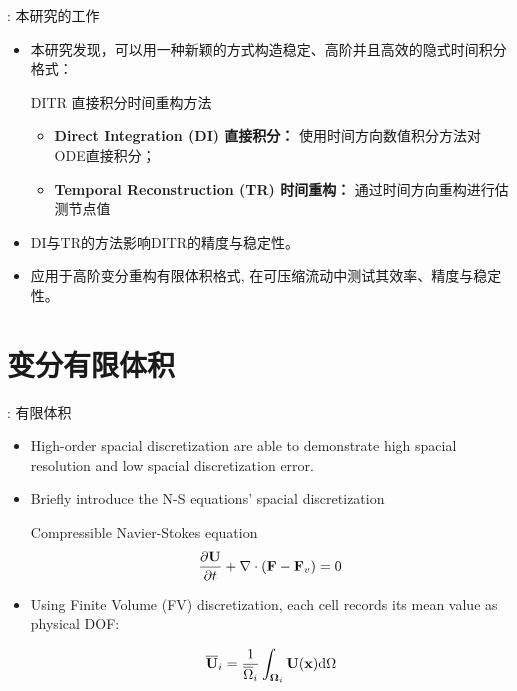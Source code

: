 \documentclass[aspectratio=169,serif]{beamer} %
\begin{document}
\begin{frame}{\secname: 本研究的工作}
  \begin{itemize}
    \item 本研究发现，可以用一种新颖的方式构造稳定、高阶并且高效的隐式时间积分格式：
          \begin{block}{DITR 直接积分时间重构方法}
            \begin{itemize}
              \item {\bf Direct Integration (DI) 直接积分：}
                    使用时间方向数值积分方法对ODE直接积分；
              \item {\bf Temporal Reconstruction (TR) 时间重构：}
                    通过时间方向重构进行估测节点值
            \end{itemize}
          \end{block}
    \item DI与TR的方法影响DITR的精度与稳定性。
    \item 应用于高阶变分重构有限体积格式, 在可压缩流动中测试其效率、精度与稳定性。
  \end{itemize}
\end{frame}

\section{变分有限体积}
\label{sec:CFV}

\begin{frame}{\secname: 有限体积}
  \begin{itemize}
    \item High-order spacial discretization are able to demonstrate
          high spacial resolution and low spacial discretization error.
    \item
          Briefly introduce the N-S equations' spacial discretization
          \begin{block}{Compressible Navier-Stokes equation}
            \begin{equation}
              \label{eq:NS}
              \frac{\partial \mathbf{U}}{\partial t} +
              \mathbf\nabla \cdot (\mathbf{F} - \mathbf{F}_v)  = 0
            \end{equation}
          \end{block}
    \item Using Finite Volume (FV) discretization, each
          cell records its mean value as physical DOF:
          \begin{block}{}
            \begin{equation}
              \label{eq:FVMean}
              \overline{\mathbf{U}}_i = \frac{1}{\overline{\Omega}_i}\int_{\mathbf{\Omega}_i}\mathbf{U}(\mathbf{x})\dd \Omega
            \end{equation}
          \end{block}
  \end{itemize}
\end{frame}
\end{document}
